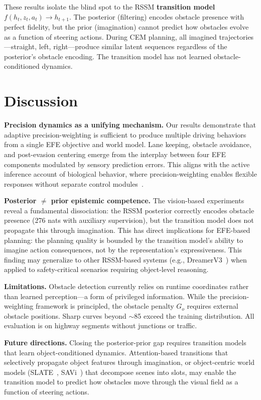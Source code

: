 \documentclass{article}
\begin{document}
These results isolate the blind spot to the RSSM
\textbf{transition model} $f(h_t, z_t, a_t) \rightarrow h_{t+1}$.
The posterior (filtering) encodes obstacle presence with
perfect fidelity, but the prior (imagination) cannot predict how
obstacles evolve as a function of steering actions. During CEM
planning, all imagined trajectories---straight, left,
right---produce similar latent sequences regardless of the
posterior's obstacle encoding. The transition model has not learned
obstacle-conditioned dynamics.

\section{Discussion}

\textbf{Precision dynamics as a unifying mechanism.}
Our results demonstrate that adaptive precision-weighting is
sufficient to produce multiple driving behaviors from a single
EFE objective and world model. Lane keeping, obstacle avoidance,
and post-evasion centering emerge from the interplay between
four EFE components modulated by sensory prediction errors.
This aligns with the active inference account of biological
behavior, where precision-weighting enables flexible responses
without separate control modules~\citep{parr2022active}.

\textbf{Posterior $\neq$ prior epistemic competence.}
The vision-based experiments reveal a fundamental dissociation:
the RSSM posterior correctly encodes obstacle presence (276 nats
with auxiliary supervision), but the transition model does not
propagate this through imagination. This has direct implications
for EFE-based planning: the planning quality is bounded by the
transition model's ability to imagine action consequences, not by
the representation's expressiveness. This finding may generalize
to other RSSM-based systems (e.g.,
DreamerV3~\citep{hafner2023mastering}) when applied to
safety-critical scenarios requiring object-level reasoning.

\textbf{Limitations.}
Obstacle detection currently relies on runtime coordinates rather
than learned perception---a form of privileged information. While
the precision-weighting framework is principled, the obstacle
penalty $G_o$ requires external obstacle positions. Sharp curves
beyond $\sim$85\degree{} exceed the training distribution. All
evaluation is on highway segments without junctions or traffic.

\textbf{Future directions.}
Closing the posterior-prior gap requires transition models that
learn object-conditioned dynamics. Attention-based transitions
that selectively propagate object features through imagination,
or object-centric world models
(SLATE~\citep{singh2022illiterate},
SAVi~\citep{kipf2022conditional}) that decompose scenes into
slots, may enable the transition model to predict how obstacles
move through the visual field as a function of steering actions.
\end{document}
